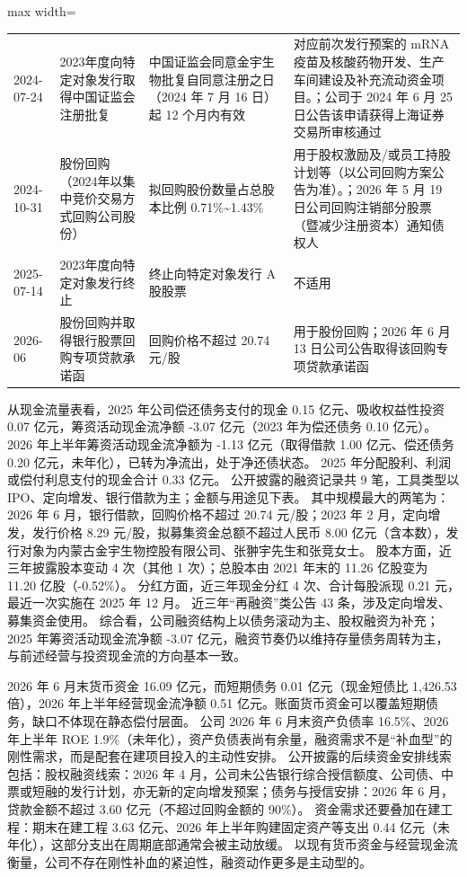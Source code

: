 \begin{center}
\begin{adjustbox}{max width=\textwidth}
\begin{tabular}{@{}p{1.45cm}p{2.55cm}p{4.05cm}p{4.95cm}@{}}
2024-07-24 & 2023年度向特定对象发行取得中国证监会注册批复 & 中国证监会同意金宇生物批复自同意注册之日（2024 年 7 月 16 日）起 12 个月内有效 & 对应前次发行预案的 mRNA 疫苗及核酸药物开发、\allowbreak{}生产车间建设及补充流动资金项目。；公司于 2024 年 6 月 25 日公告该申请获得上海证券交易所审核通过 \\
2024-10-31 & 股份回购（2024年以集中竞价交易方式回购公司股份） & 拟回购股份数量占总股本比例 0.71\%\textasciitilde{}1.43\% & 用于股权激励及/\allowbreak{}或员工持股计划等（以公司回购方案公告为准）。；2026 年 5 月 19 日公司回购注销部分股票（暨减少注册资本）通知债权人 \\
2025-07-14 & 2023年度向特定对象发行终止 & 终止向特定对象发行 A 股股票 & 不适用 \\
2026-06 & 股份回购并取得银行股票回购专项贷款承诺函 & 回购价格不超过 20.74 元/\allowbreak{}股 & 用于股份回购；2026 年 6 月 13 日公司公告取得该回购专项贷款承诺函 \\
\bottomrule
\end{tabular}
\end{adjustbox}
\end{center}

 从现金流量表看，2025 年公司偿还债务支付的现金 0.15 亿元、吸收权益性投资 0.07 亿元，筹资活动现金流净额 -3.07 亿元（2023 年为偿还债务 0.10 亿元）。 2026 年上半年筹资活动现金流净额为 -1.13 亿元（取得借款 1.00 亿元、偿还债务 0.20 亿元，未年化），已转为净流出，处于净还债状态。 2025 年分配股利、利润或偿付利息支付的现金合计 0.33 亿元。 公开披露的融资记录共 9 笔，工具类型以 IPO、定向增发、银行借款为主；金额与用途见下表。 其中规模最大的两笔为：2026 年 6 月，银行借款，回购价格不超过 20.74 元/股；2023 年 2 月，定向增发，发行价格 8.29 元/股，拟募集资金总额不超过人民币 8.00 亿元（含本数），发行对象为内蒙古金宇生物控股有限公司、张翀宇先生和张竞女士。 股本方面，近三年披露股本变动 4 次（其他 1 次）；总股本由 2021 年末的 11.26 亿股变为 11.20 亿股（-0.52\%）。 分红方面，近三年现金分红 4 次、合计每股派现 0.21 元，最近一次实施在 2025 年 12 月。 近三年“再融资”类公告 43 条，涉及定向增发、募集资金使用。 综合看，公司融资结构上以债务滚动为主、股权融资为补充；2025 年筹资活动现金流净额 -3.07 亿元，融资节奏仍以维持存量债务周转为主，与前述经营与投资现金流的方向基本一致。

 2026 年 6 月末货币资金 16.09 亿元，而短期债务 0.01 亿元（现金短债比 1,426.53 倍），2026 年上半年经营现金流净额 0.51 亿元。账面货币资金可以覆盖短期债务，缺口不体现在静态偿付层面。 公司 2026 年 6 月末资产负债率 16.5\%、2026 年上半年 ROE 1.9\%（未年化），资产负债表尚有余量，融资需求不是“补血型”的刚性需求，而是配套在建项目投入的主动性安排。 公开披露的后续资金安排线索包括：股权融资线索：2026 年 4 月，公司未公告银行综合授信额度、公司债、中票或短融的发行计划，亦无新的定向增发预案；债务与授信安排：2026 年 6 月，贷款金额不超过 3.60 亿元（不超过回购金额的 90\%）。 资金需求还要叠加在建工程：期末在建工程 3.63 亿元、2026 年上半年购建固定资产等支出 0.44 亿元（未年化），这部分支出在周期底部通常会被主动放缓。 以现有货币资金与经营现金流衡量，公司不存在刚性补血的紧迫性，融资动作更多是主动型的。




